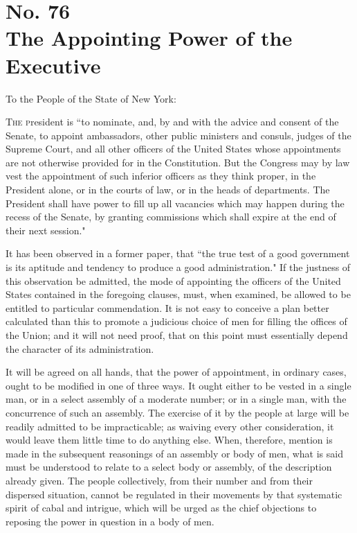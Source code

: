 \chapter[No. 76: The Appointing Power of the Executive]{No. 76\\ {\small The Appointing Power of the Executive}}
To the People of the State of New York:
\vspace{.4cm}

\textsc{The p}resident is ``to nominate, and, by and with the advice and consent of the Senate, to appoint ambassadors, other public ministers and consuls, judges of the Supreme Court, and all other officers of the United States whose appointments are not otherwise provided for in the Constitution. But the Congress may by law vest the appointment of such inferior officers as they think proper, in the President alone, or in the courts of law, or in the heads of departments. The President shall have power to fill up all vacancies which may happen during the recess of the Senate, by granting commissions which shall expire at the end of their next session."

It has been observed in a former paper, that ``the true test of a good government is its aptitude and tendency to produce a good administration." If the justness of this observation be admitted, the mode of appointing the officers of the United States contained in the foregoing clauses, must, when examined, be allowed to be entitled to particular commendation. It is not easy to conceive a plan better calculated than this to promote a judicious choice of men for filling the offices of the Union; and it will not need proof, that on this point must essentially depend the character of its administration.

It will be agreed on all hands, that the power of appointment, in ordinary cases, ought to be modified in one of three ways. It ought either to be vested in a single man, or in a select assembly of a moderate number; or in a single man, with the concurrence of such an assembly. The exercise of it by the people at large will be readily admitted to be impracticable; as waiving every other consideration, it would leave them little time to do anything else. When, therefore, mention is made in the subsequent reasonings of an assembly or body of men, what is said must be understood to relate to a select body or assembly, of the description already given. The people collectively, from their number and from their dispersed situation, cannot be regulated in their movements by that systematic spirit of cabal and intrigue, which will be urged as the chief objections to reposing the power in question in a body of men.

